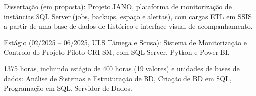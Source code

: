 
\begin{itens}
  \item Dissertação (em proposta): Projeto JANO, plataforma de monitorização de instâncias SQL Server (jobs, backups, espaço e alertas), com cargas ETL em SSIS a partir de uma base de dados de histórico e interface visual de acompanhamento.
\end{itens}

\begin{itens}
  \item Estágio (02/2025 – 06/2025, ULS Tâmega e Sousa): Sistema de Monitorização e Controlo do Projeto-Piloto CRI-SM, com SQL Server, Python e Power BI.
\end{itens}

\ifpublico
\begin{itens}
  \item 1375 horas, incluindo estágio de 400 horas (19 valores) e unidades de bases de dados: Análise de Sistemas e Estruturação de BD, Criação de BD em SQL, Programação em SQL, Servidor de Dados.
\end{itens}
\else
\vspace{4pt}
\fi

